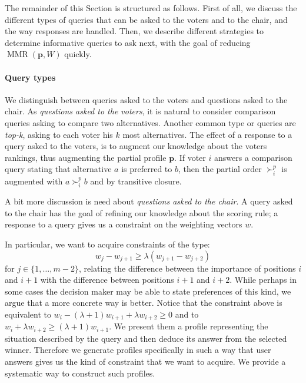 \documentclass[12pt]{article}
\newcommand{\pprofile}{\textbf{p}}%
\DeclareMathOperator{\MMR}{MMR}
\begin{document}
The remainder of this Section is structured as follows.
First of all, we discuss the different types of queries that can be asked to the voters and to the chair, and the way responses are handled.
Then, we describe different strategies to determine informative queries to ask next, with the goal of reducing $\MMR(\pprofile,W)$ quickly.


\paragraph{Query types}
We distinguish between queries asked to the voters and questions asked to the chair.
As {\em questions asked to the voters}, it is natural to consider comparison queries asking to compare two alternatives.
Another common type or queries are {\em top-k}, asking to each voter his $k$ most alternatives.
The effect of a response to a query asked to the voters, is to augment our knowledge about the voters rankings, thus augmenting the partial profile $\pprofile$. 
If voter $i$ answers a comparison query stating that alternative $a$ is preferred to $b$, then the partial order $\succ^{p}_{i}$ is augmented with $a \succ^{p}_{i} b$ and by transitive closure.

A bit more discussion is need about {\em questions asked to the chair}.
A query asked to the chair has the goal of refining our knowledge about the scoring rule;
a response to a query gives us a constraint on the weighting vectors $w$.

In particular, we want to acquire constraints of the type:
\[ w_{j} - w_{j+1} \geq \lambda (w_{j+1} - w_{j+2}) \] 
for $j \in \{1,\ldots,m-2\}$, relating the difference between the importance of positions $i$ and $i+1$ with the difference between positions $i+1$ and $i+2$.
While perhaps in some cases the decision maker may be able to state preferences of this kind, we argue that a more concrete way is better.
Notice that the constraint above is equivalent to 
$w_{i} - (\lambda+1) w_{i+1} + \lambda w_{i+2} \geq 0$
and to $w_{i} + \lambda w_{i+2} \geq  (\lambda+1) w_{i+1}$.
We present them a profile representing the situation described by the query and then deduce its answer from the selected winner. 
Therefore we generate profiles specifically in such a way that user answers gives us the kind of constraint that we want to acquire.
We provide a systematic way to construct such profiles.  %
\end{document}
